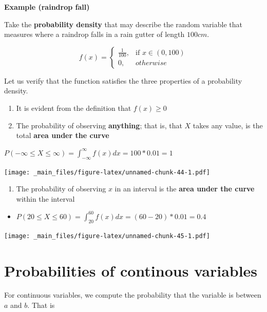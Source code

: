 \documentclass[
]{book}
\providecommand{\tightlist}{%
  \setlength{\itemsep}{0pt}\setlength{\parskip}{0pt}}
\begin{document}
\textbf{Example (raindrop fall)}

Take the \textbf{probability density} that may describe the random variable that measures where a raindrop falls in a rain gutter of length \(100cm\).

\[
    f(x)= 
\begin{cases}
    \frac{1}{100},& \text{if } x\in (0,100)\\
    0,& otherwise 
\end{cases}
\]

Let us verify that the function satisfies the three properties of a probability density.

\begin{enumerate}
\def\labelenumi{\arabic{enumi})}
\item
  It is evident from the definition that \(f(x) \geq 0\)
\item
  The probability of observing \textbf{anything}; that is, that \(X\) takes any value, is the total \textbf{area under the curve}
\end{enumerate}

\(P(-\infty\leq X \leq \infty)= \int_{-\infty}^{\infty} f(x) dx = 100*0.01= 1\)

\texttt{[image: \_main\_files/figure-latex/unnamed-chunk-44-1.pdf]}

\begin{enumerate}
\def\labelenumi{\arabic{enumi})}
\setcounter{enumi}{2}
\tightlist
\item
  The probability of observing \(x\) in an interval is the \textbf{area under the curve} within the interval
\end{enumerate}

\begin{itemize}
\tightlist
\item
  \(P(20 \leq X \leq 60) = \int_{20}^{60} f(x) dx = (60-20)*0.01=0.4\)
\end{itemize}

\texttt{[image: \_main\_files/figure-latex/unnamed-chunk-45-1.pdf]}

\hypertarget{probabilities-of-continous-variables}{%
\section{Probabilities of continous variables}\label{probabilities-of-continous-variables}}

For continuous variables, we compute the probability that the variable is between \(a\) and \(b\). That is
\end{document}
